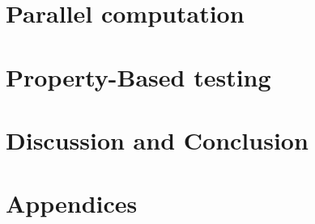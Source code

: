 \documentclass[oneside]{book}
\begin{document}




\epigraphhead[450]{}
\part{Parallel computation}


\epigraphhead[450]{}
\part{Property-Based testing}


\epigraphhead[450]{}
\part{Discussion and Conclusion}


\renewcommand\bibname{References}



\epigraphhead[450]{}
\part{Appendices}

\end{document}
